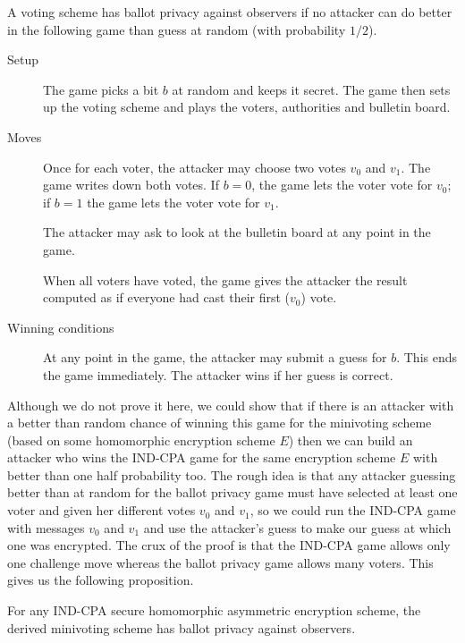 \documentclass[envcountsame]{llncs}
\begin{document}
\begin{definition}
A voting scheme has ballot privacy against observers if no attacker can do
better in the following game than guess at random (with probability $1/2$).

\begin{description}
\item[Setup] The game picks a bit $b$ at random and keeps it secret. The game
then sets up the voting scheme and plays the voters, authorities and bulletin
board.

\item[Moves] Once for each voter, the attacker may choose two votes $v_0$ and
$v_1$. The game writes down both votes. If $b = 0$, the game lets the voter vote
for $v_0$; if $b = 1$ the game lets the voter vote for $v_1$.

The attacker may ask to look at the bulletin board at any point in the game.

When all voters have voted, the game gives the attacker the result computed as
if everyone had cast their first ($v_0$) vote.

\item[Winning conditions]
At any point in the game, the attacker may submit a guess for $b$. This ends the
game immediately. The attacker wins if her guess is correct.
\end{description}
\end{definition}

Although we do not prove it here, we could show that if there is an attacker
with a better than random chance of winning this game for the minivoting scheme
(based on some homomorphic encryption scheme $E$) then we can build an attacker
who wins the IND-CPA game for the same encryption scheme $E$ with better than
one half probability too. The rough idea is that any attacker guessing better
than at random for the ballot privacy game must have selected at least one voter
and given her different votes $v_0$ and $v_1$, so we could run the IND-CPA game
with messages $v_0$ and $v_1$ and use the attacker's guess to make our guess at
which one was encrypted. The crux of the proof is that the IND-CPA game allows
only one challenge move whereas the ballot privacy game allows many voters.
This gives us the following proposition.

\begin{proposition}
For any IND-CPA secure homomorphic asymmetric encryption scheme, the derived
minivoting scheme has ballot privacy against observers.
\end{proposition}
\end{document}
